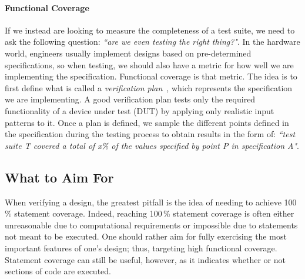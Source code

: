 \documentclass[a4paper]{IEEEtran}
\newcommand{\hjd}[1]{{\color{pink} Hans: #1}}
\begin{document}
%

\paragraph{Functional Coverage} If we instead are looking to measure the completeness of a test suite, we need to ask the following question: \textit{``are we even testing the right thing?"}. 
In the hardware world, engineers usually implement designs based on pre-determined specifications, so when testing, we should also have a metric for how well we are implementing the specification. 
Functional coverage is that metric. 
The idea is to first define what is called a \textit{verification plan}~\cite{spear2008systemverilog}, which represents the specification we are implementing. 
A good verification plan tests only the required functionality of a device under test (DUT) by applying only 
realistic input patterns to it.
Once a plan is defined, we sample the different points defined in the specification during the testing process to obtain results in the form of: \textit{``test suite T covered a total of x\% of the values specified by point P in specification A"}. 

\subsection{What to Aim For}
When verifying a design, the greatest pitfall is the idea of needing to achieve 100\,\% statement coverage. Indeed, reaching 100\,\% statement coverage is often either unreasonable due to computational requirements or impossible due to statements not meant to be executed. One should rather aim for fully exercising the most important features of one's design; thus, targeting high functional coverage. Statement coverage can still be useful, however, as it indicates whether or not sections of code are executed. 
\end{document}
